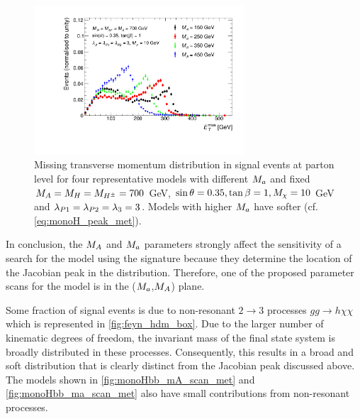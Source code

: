 \begin{figure}[tbp]
\centering
\includegraphics[width=0.7\textwidth]{texinputs/04_grid/figures/monoHbb_m_small_a_scan_MET_liny_norm2one.pdf}
\caption[$\MET$ distribution in  \monohbb events for different $\ma$]
{
Missing transverse momentum distribution in  \monohbb signal events at parton level for four representative models with different $\ma$ 
and fixed $ M_{A}=M_{H}=M_{H^{\pm}}= 700$ GeV, $ \sin\theta = 0.35, \tan\beta = 1, M_{\chi} = 10$ GeV and $ \lambda_{P1} = \lambda_{P2} = \lambda_{3} = 3 $. 
Models with higher $\ma$ have softer \met (cf. \autoref{eq:monoH_peak_met}).
%
}
\label{fig:monoHbb_ma_scan_met}
\end{figure}


In conclusion, the $M_{A}$ and $\ma$ parameters strongly affect the sensitivity of a search for the \hdma model using the \monohbb signature because they determine the location of the Jacobian peak in the \met distribution. Therefore, one of the proposed parameter scans for the \hdma model is in the ($\ma$,$M_{A}$) plane.


Some fraction of signal events is due to non-resonant $2 \to 3$ processes $gg \to h \chi \chi$ which is represented in \autoref{fig:feyn_hdm_box}. 
Due to the larger number of kinematic degrees of freedom, the  invariant mass of the final state system is broadly distributed in these processes.
Consequently, this results in a broad and soft \met distribution that is clearly distinct from the Jacobian peak discussed above.
The models shown in \autoref{fig:monoHbb_mA_scan_met} and \autoref{fig:monoHbb_ma_scan_met} also have small contributions from non-resonant processes.


